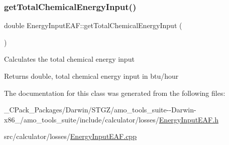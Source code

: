 \subsubsection{\texorpdfstring{get\+Total\+Chemical\+Energy\+Input()}{getTotalChemicalEnergyInput()}\hspace{0.1cm}{\footnotesize\ttfamily [3/3]}}
{\footnotesize\ttfamily double Energy\+Input\+E\+A\+F\+::get\+Total\+Chemical\+Energy\+Input (\begin{DoxyParamCaption}{ }\end{DoxyParamCaption})}

Calculates the total chemical energy input \begin{DoxyReturn}{Returns}
double, total chemical energy input in btu/hour 
\end{DoxyReturn}


The documentation for this class was generated from the following files\+:\begin{DoxyCompactItemize}
\item 
\+\_\+\+C\+Pack\+\_\+\+Packages/\+Darwin/\+S\+T\+G\+Z/amo\+\_\+tools\+\_\+suite-\/-\/\+Darwin-\/x86\+\_/amo\+\_\+tools\+\_\+suite/include/calculator/losses/\hyperlink{___c_pack___packages_2_darwin_2_s_t_g_z_2amo__tools__suite--_darwin-x86__64_2amo__tools__suite_25a35b9aa0eebdbaae0658026a04be93f}{Energy\+Input\+E\+A\+F.\+h}\item 
src/calculator/losses/\hyperlink{_energy_input_e_a_f_8cpp}{Energy\+Input\+E\+A\+F.\+cpp}\end{DoxyCompactItemize}
